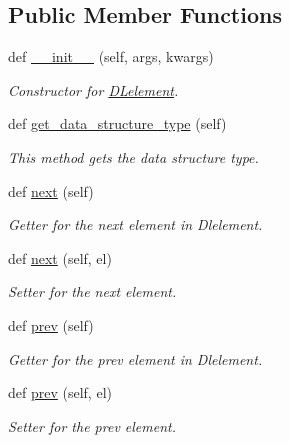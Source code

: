 \subsection*{Public Member Functions}
\begin{DoxyCompactItemize}
\item 
def \hyperlink{classbridges_1_1dl__element_1_1_d_lelement_a54256a7be5796b0471cb2655dd971bd5}{\+\_\+\+\_\+init\+\_\+\+\_\+} (self, args, kwargs)
\begin{DoxyCompactList}\small\item\em Constructor for \hyperlink{classbridges_1_1dl__element_1_1_d_lelement}{D\+Lelement}. \end{DoxyCompactList}\item 
def \hyperlink{classbridges_1_1dl__element_1_1_d_lelement_a5fb177ed67b75e606ac303f7a972d301}{get\+\_\+data\+\_\+structure\+\_\+type} (self)
\begin{DoxyCompactList}\small\item\em This method gets the data structure type. \end{DoxyCompactList}\item 
def \hyperlink{classbridges_1_1dl__element_1_1_d_lelement_a43077e810ec453c9cd512ba75819e28a}{next} (self)
\begin{DoxyCompactList}\small\item\em Getter for the next element in Dlelement. \end{DoxyCompactList}\item 
def \hyperlink{classbridges_1_1dl__element_1_1_d_lelement_ae46f630cd7384689d4305770e6b2c7c1}{next} (self, el)
\begin{DoxyCompactList}\small\item\em Setter for the next element. \end{DoxyCompactList}\item 
def \hyperlink{classbridges_1_1dl__element_1_1_d_lelement_a66e7c4bfb2216a68744fe58c24e9917f}{prev} (self)
\begin{DoxyCompactList}\small\item\em Getter for the prev element in Dlelement. \end{DoxyCompactList}\item 
def \hyperlink{classbridges_1_1dl__element_1_1_d_lelement_a17c371ec0c38e9555e55551d9be4d185}{prev} (self, el)
\begin{DoxyCompactList}\small\item\em Setter for the prev element. \end{DoxyCompactList}\item 

\end{DoxyCompactItemize}
